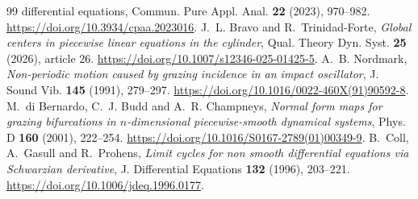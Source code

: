 \documentclass[11pt,a4paper]{article}
\begin{document}
\begin{thebibliography}{99}
{differential equations}, Commun. Pure Appl. Anal. \textbf{22} (2023), 970--982.
\href{https://doi.org/10.3934/cpaa.2023016}{https://doi.org/10.3934/cpaa.2023016}.
J.~L. Bravo and R.~Trinidad-Forte,
\emph{Global centers in piecewise linear equations in the cylinder},
Qual. Theory Dyn. Syst. \textbf{25} (2026), article 26.
\href{https://doi.org/10.1007/s12346-025-01425-5}{https://doi.org/10.1007/s12346-025-01425-5}.
A.~B. Nordmark,
\emph{Non-periodic motion caused by grazing incidence in an impact oscillator},
J. Sound Vib. \textbf{145} (1991), 279--297.
\href{https://doi.org/10.1016/0022-460X(91)90592-8}{https://doi.org/10.1016/0022-460X(91)90592-8}.
M.~di Bernardo, C.~J. Budd and A.~R. Champneys,
\emph{Normal form maps for grazing bifurcations in $n$-dimensional
piecewise-smooth dynamical systems},
Phys. D \textbf{160} (2001), 222--254.
\href{https://doi.org/10.1016/S0167-2789(01)00349-9}{https://doi.org/10.1016/S0167-2789(01)00349-9}.
B.~Coll, A.~Gasull and R.~Prohens,
\emph{Limit cycles for non smooth differential equations via Schwarzian derivative},
J. Differential Equations \textbf{132} (1996), 203--221.
\href{https://doi.org/10.1006/jdeq.1996.0177}{https://doi.org/10.1006/jdeq.1996.0177}.
\end{thebibliography}
\end{document}
